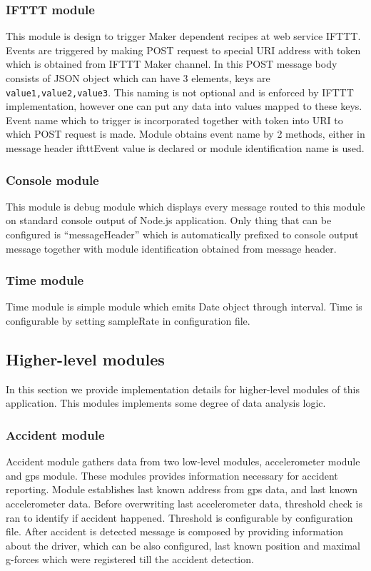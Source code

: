\subsubsection{IFTTT module} %
\label{ssub:ifttt_module}
This module is design to trigger Maker dependent recipes at web service IFTTT. Events are triggered by making POST request to special URI address with token which is obtained from IFTTT Maker channel. In this POST message body consists of JSON object which can have 3 elements, keys are \verb|value1,value2,value3|. This naming is not optional and is enforced by IFTTT implementation, however one can put any data into values mapped to these keys. Event name which to trigger is incorporated together with token into URI to which POST request is made. Module obtains event name by 2 methods, either in message header iftttEvent value is declared or module identification name is used.
\subsubsection{Console module} %
\label{ssub:console_module}
This module is debug module which displays every message routed to this module on standard console output of Node.js application. Only thing that can be configured is ``messageHeader'' which is automatically prefixed to console output message together with module identification obtained from message header.
\subsubsection{Time module} %
\label{ssub:time_module}
Time module is simple module which emits Date object through interval. Time is configurable by setting sampleRate in configuration file.
\subsection{Higher-level modules} %
\label{sub:higher_level_modules}
In this section we provide implementation details for higher-level modules of this application. This modules implements some degree of data analysis logic.
\subsubsection{Accident module} %
\label{ssub:accident_module}
Accident module gathers data from two low-level modules, accelerometer module and gps module. These modules provides information necessary for accident reporting. Module establishes last known address from gps data, and last known accelerometer data. Before overwriting last accelerometer data, threshold check is ran to identify if accident happened. Threshold is configurable by configuration file. After accident is detected message is composed by providing information about the driver, which can be also configured, last known position and maximal g-forces which were registered till the accident detection.
